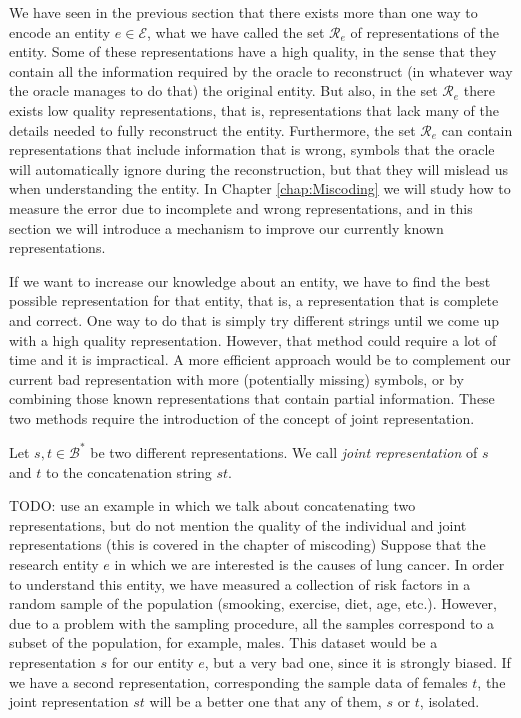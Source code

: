 We have seen in the previous section that there exists more than one way to encode an entity $e \in \mathcal{E}$, what we have called the set $\mathcal{R}_e$ of representations of the entity. Some of these representations have a high quality, in the sense that they contain all the information required by the oracle to reconstruct (in whatever way the oracle manages to do that) the original entity. But also, in the set $\mathcal{R}_e$ there exists low quality representations, that is, representations that lack many of the details needed to fully reconstruct the entity. Furthermore, the set $\mathcal{R}_e$ can contain representations that include information that is wrong, symbols that the oracle will automatically ignore during the reconstruction, but that they will mislead us when understanding the entity. In Chapter \ref{chap:Miscoding} we will study how to measure the error due to incomplete and wrong representations, and in this section we will introduce a mechanism to improve our currently known representations.

If we want to increase our knowledge about an entity, we have to find the best possible representation for that entity, that is, a representation that is complete and correct. One way to do that is simply try different strings until we come up with a high quality representation. However, that method could require a lot of time and it is impractical. A more efficient approach would be to complement our current bad representation with more (potentially missing) symbols, or by combining those known representations that contain partial information. These two methods require the introduction of the concept of joint representation.

\begin{definition}
Let $s, t \in \mathcal{B}^\ast$ be two different representations. We call \emph{joint representation} of $s$ and $t$ to the concatenation string $st$.
\end{definition}

\begin{example}
\label{ex:lung_cancer}
{\color{red} TODO: use an example in which we talk about concatenating two representations, but do not mention the quality of the individual and joint representations (this is covered in the chapter of miscoding)}
Suppose that the research entity $e$ in which we are interested is the causes of lung cancer. In order to understand this entity, we have measured a collection of risk factors in a random sample of the population (smooking, exercise, diet, age, etc.). However, due to a problem with the sampling procedure, all the samples correspond to a subset of the population, for example, males. This dataset would be a representation $s$ for our entity $e$, but a very bad one, since it is strongly biased. If we have a second representation, corresponding the sample data of females $t$, the joint representation $st$ will be a better one that any of them, $s$ or $t$, isolated.
\end{example}

